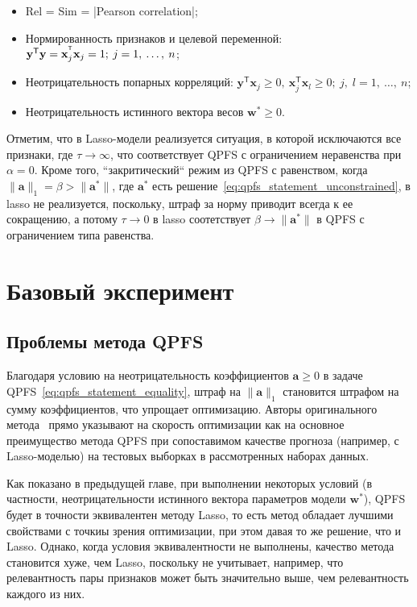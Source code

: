 \documentclass[12pt, twoside]{article}
\newcommand{\ba}{\mathbf{a}}
\newcommand{\bx}{\mathbf{x}}
\newcommand{\by}{\mathbf{y}}
\newcommand{\bw}{\mathbf{w}}
\newcommand{\getT}{^{\mathsf{T}}}
\begin{document}
\begin{itemize}
\item Rel = Sim = |Pearson correlation|;

\item Нормированность признаков и целевой переменной: $\by\getT \by = \bx_j^{\T} \bx_j = 1;\:j=1,\:\ldots,\:n$;

\item Неотрицательность попарных корреляций: $\by\getT \bx_j \geq 0,\:\bx_j\getT \bx_l \geq 0;\:j,\;l=1,\:\ldots,\:n$;

\item Неотрицательность истинного вектора весов $\bw^* \geq 0$.
\end{itemize}
Отметим, что в Lasso-модели реализуется ситуация, в которой исключаются все признаки, где $\tau \to \infty$, что соответствует QPFS с ограничением неравенства при $\alpha=0$. Кроме того, ``закритический`` режим из QPFS с равенством, когда $\|\ba\|_1 = \beta > \|\ba^*\|$, где $\ba^*$ есть решение~\eqref{eq:qpfs_statement_unconstrained}, в lasso не реализуется, поскольку, штраф за норму приводит всегда к ее сокращению, а потому $\tau \to 0$ в lasso соотетствует $\beta \to \|\ba^*\|$ в QPFS с ограничением типа равенства.

\section{Базовый эксперимент}

\subsection{Проблемы метода QPFS}
Благодаря условию на неотрицательность коэффициентов $\ba \geq 0$ в задаче QPFS~\eqref{eq:qpfs_statement_equality}, штраф на $\|\ba\|_1$ становится штрафом на сумму коэффициентов, что упрощает оптимизацию. Авторы оригинального метода~\cite{qpfs_original} прямо указывают на скорость оптимизации как на основное преимущество метода QPFS при сопоставимом качестве прогноза (например, с Lasso-моделью) на тестовых выборках в рассмотренных наборах данных. 

Как показано в предыдущей главе, при выполнении некоторых условий (в частности, неотрицательности истинного вектора параметров модели $\bw^*$), QPFS будет в точности эквивалентен методу Lasso, то есть метод обладает лучшими свойствами с точкиы зрения оптимизации, при этом давая то же решение, что и Lasso. Однако, когда условия эквивалентности не выполнены, качество метода становится хуже, чем Lasso, поскольку не учитывает, например, что релевантность пары признаков может быть значительно выше, чем релевантность каждого из них.
\end{document}
